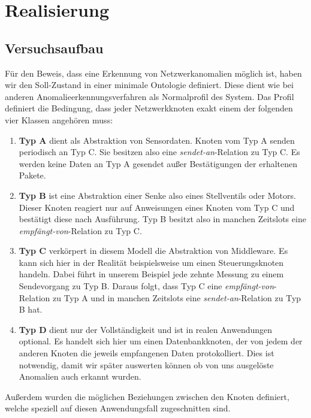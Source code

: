 \chapter{Realisierung}
\section{Versuchsaufbau}
Für den Beweis, dass eine Erkennung von Netzwerkanomalien möglich ist, haben wir den Soll-Zustand in einer minimale Ontologie definiert. Diese dient wie bei anderen Anomalieerkennungsverfahren als Normalprofil des System\cite{ye2001anomaly}. Das Profil definiert die Bedingung, dass jeder Netzwerkknoten exakt einem der folgenden vier Klassen angehören muss:
\begin{enumerate}
\item\textbf{Typ A} dient als Abstraktion von Sensordaten. Knoten vom Typ A senden periodisch an Typ C. Sie besitzen also eine \textit{sendet-an}-Relation zu Typ C. Es werden keine Daten an Typ A gesendet außer Bestätigungen der erhaltenen Pakete.
\item\textbf{Typ B} ist eine Abstraktion einer Senke also eines Stellventils oder Motors. Dieser Knoten reagiert nur auf Anweisungen eines Knoten vom Typ C und bestätigt diese nach Ausführung. Typ B besitzt also in manchen Zeitslots eine \textit{empfängt-von}-Relation zu Typ C.
\item\textbf{Typ C} verkörpert in diesem Modell die Abstraktion von Middleware. Es kann sich hier in der Realität beispielsweise um einen Steuerungsknoten handeln. Dabei führt in unserem Beispiel jede zehnte Messung zu einem Sendevorgang zu Typ B. Daraus folgt, dass Typ C eine \textit{empfängt-von}-Relation zu Typ A und in manchen Zeitslots eine \textit{sendet-an}-Relation zu Typ B hat.
\item\textbf{Typ D} dient nur der Vollständigkeit und ist in realen Anwendungen optional. Es handelt sich hier um einen Datenbankknoten, der von jedem der anderen Knoten die jeweils empfangenen Daten protokolliert. Dies ist notwendig, damit wir später auswerten können ob von uns ausgelöste Anomalien auch erkannt wurden.
\end{enumerate}
Außerdem wurden die möglichen Beziehungen zwischen den Knoten definiert, welche speziell auf diesen Anwendungsfall zugeschnitten sind.

